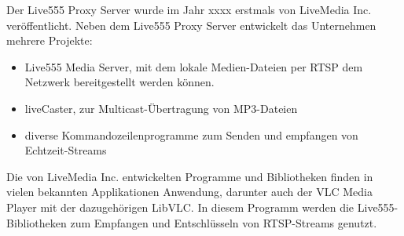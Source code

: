 Der Live555 Proxy Server wurde im Jahr xxxx erstmals von LiveMedia Inc. veröffentlicht. Neben dem Live555 Proxy Server entwickelt das Unternehmen mehrere Projekte:
\begin{itemize}
    \item Live555 Media Server, mit dem lokale Medien-Dateien per RTSP dem Netzwerk bereitgestellt werden können.
    \item liveCaster, zur Multicast-Übertragung von MP3-Dateien
    \item diverse Kommandozeilenprogramme zum Senden und empfangen von Echtzeit-Streams
\end{itemize}
Die von LiveMedia Inc. entwickelten Programme und Bibliotheken finden in vielen bekannten Applikationen Anwendung, darunter auch der VLC Media Player mit der dazugehörigen LibVLC. In diesem Programm werden die Live555-Bibliotheken zum Empfangen und Entschlüsseln von RTSP-Streams genutzt.
